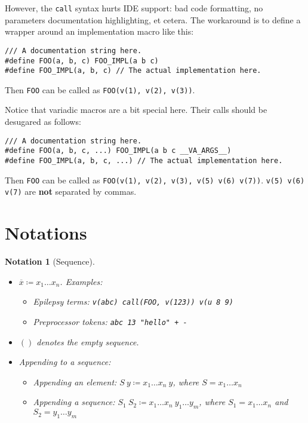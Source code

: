 \documentclass[12pt]{article}
\theoremstyle{break}
\newtheorem{notation}{Notation}
\begin{document}
However, the \texttt{call} syntax hurts IDE support: bad code formatting, no parameters
documentation highlighting, et cetera. The workaround is to define a wrapper around
an implementation macro like this:

\begin{verbatim}
/// A documentation string here.
#define FOO(a, b, c) FOO_IMPL(a b c)
#define FOO_IMPL(a, b, c) // The actual implementation here.
\end{verbatim}

Then \texttt{FOO} can be called as \texttt{FOO(v(1), v(2), v(3))}.

Notice that variadic macros are a bit special here. Their calls should be desugared as follows:

\begin{verbatim}
/// A documentation string here.
#define FOO(a, b, c, ...) FOO_IMPL(a b c __VA_ARGS__)
#define FOO_IMPL(a, b, c, ...) // The actual implementation here.
\end{verbatim}

Then \texttt{FOO} can be called as \texttt{FOO(v(1), v(2), v(3), v(5) v(6) v(7))}.
\texttt{v(5) v(6) v(7)} are \textbf{not} separated by commas.

\section{Notations}

\begin{notation}[Sequence]
    \begin{itemize}
        \item $\overline{x} \coloneqq x_1 \ldots x_n$. Examples:
        \begin{itemize}
            \item Epilepsy terms: \texttt{v(abc) call(FOO, v(123)) v(u 8 9)}
            \item Preprocessor tokens: \texttt{abc 13 "hello" + -}
        \end{itemize}
        \item $()$ denotes the empty sequence.
        \item Appending to a sequence:
        \begin{itemize}
            \item Appending an element: $S \ y \coloneqq x_1 \ldots x_n \ y$, where $S = x_1 \ldots x_n$
            \item Appending a sequence: $S_1 \ S_2 \coloneqq x_1 \ldots x_n \ y_1 \ldots y_m$, where $S_1 = x_1 \ldots x_n$
            and $S_2 = y_1 \ldots y_m$
        \end{itemize}
    \end{itemize}
\end{notation}
\end{document}

